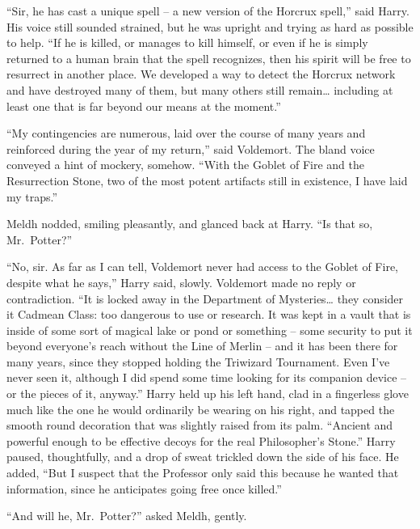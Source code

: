 ``Sir, he has cast a unique spell -- a new version of the Horcrux
spell,'' said Harry. His voice still sounded strained, but he was
upright and trying as hard as possible to help. ``If he is killed, or
manages to kill himself, or even if he is simply returned to a human
brain that the spell recognizes, then his spirit will be free to
resurrect in another place. We developed a way to detect the Horcrux
network and have destroyed many of them, but many others still
remain\ldots{} including at least one that is far beyond our means at
the moment.''

``My contingencies are numerous, laid over the course of many years and
reinforced during the year of my return,'' said Voldemort. The bland
voice conveyed a hint of mockery, somehow. ``With the Goblet of Fire and
the Resurrection Stone, two of the most potent artifacts still in
existence, I have laid my traps.''

Meldh nodded, smiling pleasantly, and glanced back at Harry. ``Is that
so, Mr.~Potter?''

``No, sir. As far as I can tell, Voldemort never had access to the
Goblet of Fire, despite what he says,'' Harry said, slowly. Voldemort
made no reply or contradiction. ``It is locked away in the Department of
Mysteries\ldots{} they consider it Cadmean Class: too dangerous to use
or research. It was kept in a vault that is inside of some sort of
magical lake or pond or something -- some security to put it beyond
everyone's reach without the Line of Merlin -- and it has been there for
many years, since they stopped holding the Triwizard Tournament. Even
I've never seen it, although I did spend some time looking for its
companion device -- or the pieces of it, anyway.'' Harry held up his
left hand, clad in a fingerless glove much like the one he would
ordinarily be wearing on his right, and tapped the smooth round
decoration that was slightly raised from its palm. ``Ancient and
powerful enough to be effective decoys for the real Philosopher's
Stone.'' Harry paused, thoughtfully, and a drop of sweat trickled down
the side of his face. He added, ``But I suspect that the Professor only
said this because he wanted that information, since he anticipates going
free once killed.''

``And will he, Mr.~Potter?'' asked Meldh, gently.

